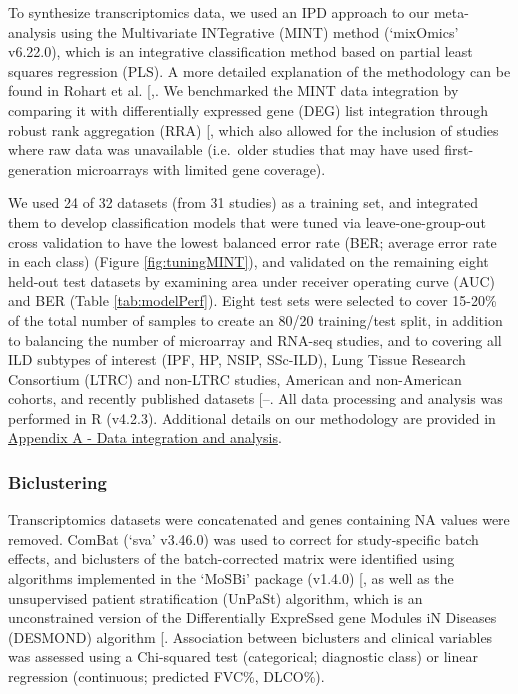 \documentclass[
]{article}
\begin{document}
To synthesize transcriptomics data, we used an IPD approach to our meta-analysis using the Multivariate INTegrative (MINT) method (`mixOmics' v6.22.0), which is an integrative classification method based on partial least squares regression (PLS). A more detailed explanation of the methodology can be found in Rohart et al. {[},\citeproc{ref-rohart_mixomics_2017}{42}{]}. We benchmarked the MINT data integration by comparing it with differentially expressed gene (DEG) list integration through robust rank aggregation (RRA) {[}\citeproc{ref-kolde_robust_2012}{43}{]}, which also allowed for the inclusion of studies where raw data was unavailable (i.e.~older studies that may have used first-generation microarrays with limited gene coverage).

We used 24 of 32 datasets (from 31 studies) as a training set, and integrated them to develop classification models that were tuned via leave-one-group-out cross validation to have the lowest balanced error rate (BER; average error rate in each class) (Figure \ref{fig:tuningMINT}), and validated on the remaining eight held-out test datasets by examining area under receiver operating curve (AUC) and BER (Table \ref{tab:modelPerf}). Eight test sets were selected to cover 15-20\% of the total number of samples to create an 80/20 training/test split, in addition to balancing the number of microarray and RNA-seq studies, and to covering all ILD subtypes of interest (IPF, HP, NSIP, SSc-ILD), Lung Tissue Research Consortium (LTRC) and non-LTRC studies, American and non-American cohorts, and recently published datasets {[}--\citeproc{ref-jaffar_matrix_2022}{51}{]}. All data processing and analysis was performed in R (v4.2.3). Additional details on our methodology are provided in \hyperref[data]{Appendix A - Data integration and analysis}.

\subsubsection{Biclustering}\label{biclustering}

Transcriptomics datasets were concatenated and genes containing NA values were removed. ComBat (`sva' v3.46.0) was used to correct for study-specific batch effects, and biclusters of the batch-corrected matrix were identified using algorithms implemented in the `MoSBi' package (v1.4.0) {[}\citeproc{ref-rose_mosbi_2022}{52}{]}, as well as the unsupervised patient stratification (UnPaSt) algorithm, which is an unconstrained version of the Differentially ExpreSsed gene Modules iN Diseases (DESMOND) algorithm {[}\citeproc{ref-zolotareva_identification_2021}{53}{]}. Association between biclusters and clinical variables was assessed using a Chi-squared test (categorical; diagnostic class) or linear regression (continuous; predicted FVC\%, DLCO\%).
\end{document}
